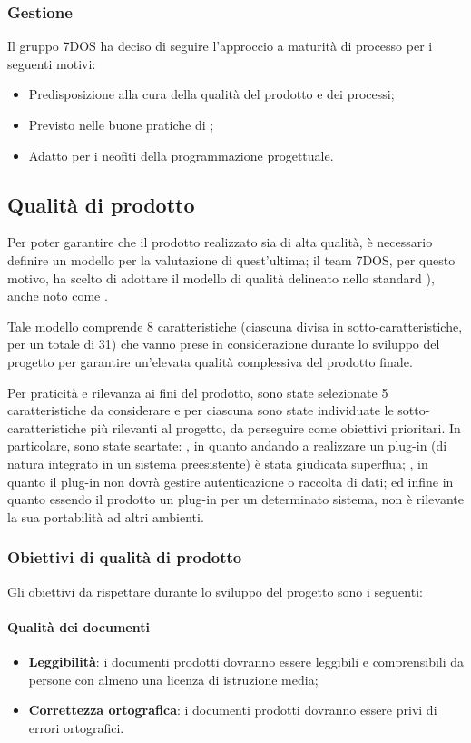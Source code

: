 \subsubsection{Gestione}
	Il gruppo 7DOS ha deciso di seguire l'approccio a maturità di processo per i seguenti motivi:
	\begin{itemize}
	\item Predisposizione alla cura della qualità del prodotto e dei processi;
	\item Previsto nelle buone pratiche di ;
	\item Adatto per i neofiti della programmazione progettuale.
	\end{itemize}
	
\subsection{Qualità di prodotto}
Per poter garantire che il prodotto realizzato sia di alta qualità, è necessario definire un modello per la valutazione di quest'ultima; il team 7DOS, per questo motivo, ha scelto di adottare il modello di qualità delineato nello standard ), anche noto come .

Tale modello comprende 8 caratteristiche (ciascuna divisa in sotto-caratteristiche, per un totale di 31) che vanno prese in considerazione durante lo sviluppo del progetto per garantire un'elevata qualità complessiva del prodotto finale.

Per praticità e rilevanza ai fini del prodotto, sono state selezionate 5 caratteristiche da considerare e per ciascuna sono state individuate le sotto-caratteristiche più rilevanti al progetto, da perseguire come obiettivi prioritari. In particolare, sono state scartate: , in quanto andando a realizzare un plug-in (di natura integrato in un sistema preesistente) è stata giudicata superflua; , in quanto il plug-in non dovrà gestire autenticazione o raccolta di dati; ed infine  in quanto essendo il prodotto un plug-in per un determinato sistema, non è rilevante la sua portabilità ad altri ambienti. 

\subsubsection{Obiettivi di qualità di prodotto}
Gli obiettivi da rispettare durante lo sviluppo del progetto sono i seguenti:

\paragraph{Qualità dei documenti}
	\begin{itemize}
		\item{\textbf{Leggibilità}: i documenti prodotti dovranno essere leggibili e comprensibili da persone con almeno una licenza di istruzione media;}
		\item{\textbf{Correttezza ortografica}: i documenti prodotti dovranno essere privi di errori ortografici.}
	\end{itemize}

